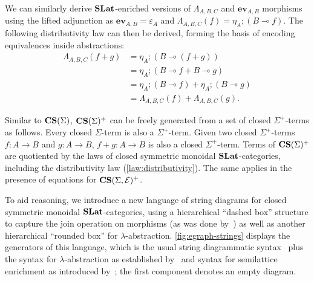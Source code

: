We can similarly derive $\mathbf{SLat}$-enriched versions of  $\Lambda_{A,B,C}$ and $\textbf{ev}_{A,B}$ morphisms using the lifted adjunction as $\textbf{ev}_{A,B} = \varepsilon_{A}$ and $\Lambda_{A,B,C}(f) = \eta_A; (B \multimap{} f)$.
The following distributivity law can then be derived, forming the basis of encoding equivalences inside abstractions:
\begin{equation}
	\begin{aligned}
		\Lambda_{A,B,C}(f + g) & = \eta_A;(B \multimap (f + g))                    \\
		                       & = \eta_A;(B \multimap f + B \multimap g)          \\
		                       & = \eta_A;(B \multimap f) + \eta_A;(B \multimap g) \\
		                       & = \Lambda_{A,B,C}(f) + \Lambda_{A,B,C}(g).
	\end{aligned}%
	\label{law:distributivity}
\end{equation}

Similar to $\mathbf{CS}(\Sigma)$, $\mathbf{CS}(\Sigma)^{+}$ can be freely generated from a set of closed $\Sigma^{+}$-terms as follows.
Every closed $\Sigma$-term is also a $\Sigma^{+}$-term.
Given two closed $\Sigma^{+}$-terms $f\colon A \to B$ and $g\colon A \to B$, $f + g\colon A \to B$ is also a closed $\Sigma^{+}$-term.
Terms of $\mathbf{CS}(\Sigma)^{+}$ are quotiented by the laws of closed symmetric monoidal $\mathbf{SLat}$-categories, including the distributivity law (\autoref{law:distributivity}).
The same applies in the presence of equations for $\mathbf{CS}(\Sigma,\mathcal{E})^{+}$.

To aid reasoning, we introduce a new language of string diagrams for closed symmetric monoidal $\mathbf{SLat}$-categories, using a hierarchical \enquote{dashed box} structure to capture the join operation on morphisms (as was done by~\citet{tiurin2025equivalencehypergraphsdporewriting}) as well as another hierarchical \enquote{rounded box} for $\lambda$-abstraction.
\autoref{fig:egraph-strings} displays the generators of this language, which is the usual string diagrammatic syntax~\cite{Selinger_2010} plus the syntax for $\lambda$-abstraction as established by~\citet{ghica2024stringdiagramslambdacalculifunctional} and syntax for semilattice enrichment as introduced by~\citet{tiurin2025equivalencehypergraphsdporewriting}; the first component denotes an empty diagram.


